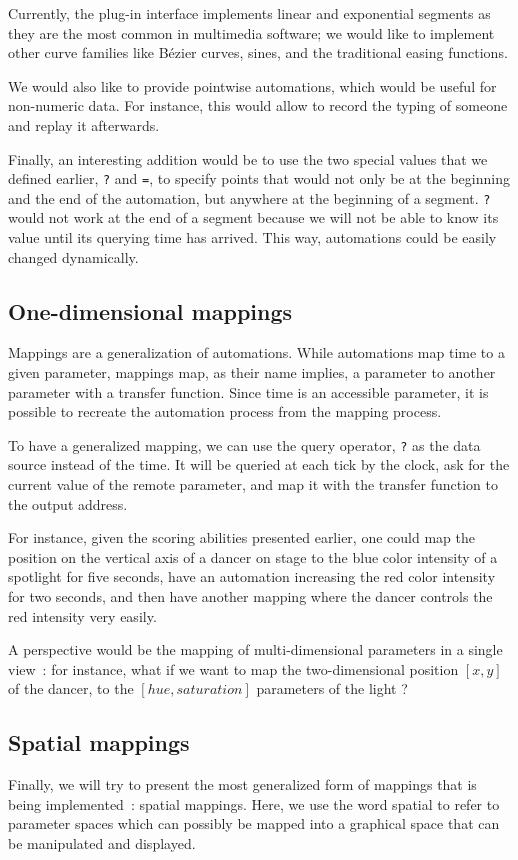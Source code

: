 \documentclass{sigchi}
\begin{document}
Currently, the plug-in interface implements linear and exponential segments as they are the most common in multimedia software; we would like to implement other curve families like B\'ezier curves, sines, and the traditional easing functions\cite{hudson1993animation}.

We would also like to provide pointwise automations, which would be useful for non-numeric data. For instance, this would allow to record the typing of someone and replay it afterwards.

Finally, an interesting addition would be to use the two special values that we defined earlier, \texttt{?} and \texttt{=}, to specify points that would not only be at the beginning and the end of the automation, but anywhere at the beginning of a segment. \texttt{?} would not work at the end of a segment because we will not be able to know its value until its querying time has arrived. This way, automations could be easily changed dynamically.

\subsection{One-dimensional mappings}
Mappings are a generalization of automations. While automations map time to a given parameter, mappings map, as their name implies, a parameter to another parameter with a transfer function. Since time is an accessible parameter, it is possible to recreate the automation process from the mapping process.

To have a generalized mapping, we can use the query operator, \texttt{?} as the data source instead of the time. It will be queried at each tick by the clock, ask for the current value of the remote parameter, and map it with the transfer function to the output address.

For instance, given the scoring abilities presented earlier, one could map the position on the vertical axis of a dancer on stage to the blue color intensity of a spotlight for five seconds, have an automation increasing the red color intensity for  two seconds, and then have another mapping where the dancer controls the red intensity very easily.

A perspective would be the mapping of multi-dimensional parameters in a single view~: for instance, what if we want to map the two-dimensional position $[x, y]$ of the dancer, to the $[hue, saturation]$ parameters of the light ?

\subsection{Spatial mappings}
Finally, we will try to present the most generalized form of mappings that is being implemented~: spatial mappings. Here, we use the word spatial to refer to parameter spaces which can possibly be mapped into a graphical space that can be manipulated and displayed. 
\end{document}
